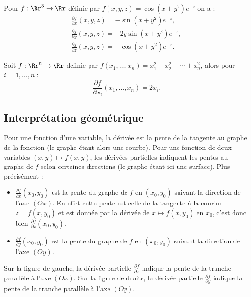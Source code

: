 \begin{exemple}{}{}
	Pour $f : \Rr^3 \to \Rr$ définie par $f(x,y,z)=\cos (x+y^2)e^{-z}$ on a :
	\begin{align*}
		\frac{\partial f}{\partial x}(x,y,z) = -\sin(x+y^2)e^{-z}, \\
		\frac{\partial f}{\partial y}(x,y,z) = -2y\sin(x+y^2)e^{-z}, \\
		\frac{\partial f}{\partial z}(x,y,z) = -\cos(x+y^2)e^{-z}.
	\end{align*}
\end{exemple}


\begin{exemple}{}{}
	Soit $f :\Rr^n \to \Rr$ définie par 
	$f(x_1,\ldots,x_n) = x_1^2+x_2^2+\cdots + x_n^2$,
	alors pour $i=1,\ldots,n$ :
	$$\frac{\partial f}{\partial x_i}(x_1,\ldots,x_n) = 2x_i.$$
\end{exemple}


\subsection{Interprétation géométrique}


Pour une fonction d'une variable, la dérivée est la pente de la tangente au graphe de la fonction (le graphe étant alors une courbe). Pour une fonction de deux variables $(x,y) \mapsto f(x,y)$, les dérivées partielles indiquent les pentes au graphe de $f$ selon certaines directions (le graphe étant ici une surface). Plus précisément :

\begin{itemize}
	\item $\frac{\partial f}{\partial x} (x_0,y_0)$ est la pente du graphe de $f$
	en $(x_0,y_0)$ suivant la direction de l'axe $(Ox)$.
	En effet cette pente est celle de la tangente à la courbe $z = f(x,y_0)$ et est donnée par la dérivée de $x \mapsto f(x,y_0)$ en $x_0$, c'est donc bien $\frac{\partial f}{\partial x} (x_0,y_0)$.
	
	\item $\frac{\partial f}{\partial y} (x_0,y_0)$ est la pente du graphe de $f$
	en $(x_0,y_0)$ suivant la direction de l'axe $(Oy)$.
	
	
\end{itemize}



\bigskip 
Sur la figure de gauche, la dérivée partielle  $\frac{\partial f}{\partial x}$ indique la pente de la tranche parallèle à l'axe $(Ox)$. Sur la figure de droite, la dérivée partielle  $\frac{\partial f}{\partial y}$ indique la pente de la tranche parallèle à l'axe $(Oy)$.


